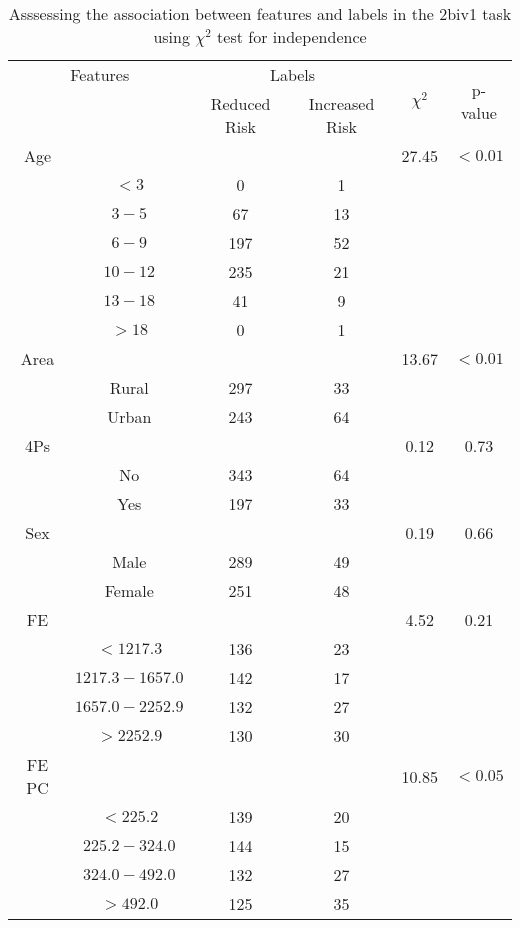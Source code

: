 \begin{table}[!htb]
\centering
\caption{Asssessing the association between features and labels in the 2biv1 task using $\chi^2$ test for independence}
\label{tab:chitest_2biv1}
\begin{tabular}{c c | c c| c | c}
\hline
\multicolumn{2}{c|}{Features}& \multicolumn{2}{c|}{Labels}& \multirow{2}{*}{$\chi^2$} & \multirow{2}{*}{p-value}\\ 
& & Reduced Risk & Increased Risk & & \\ 
\hline
Age &  &  & & 27.45 & $< 0.01$ \\ 
& $< 3$ & 0 & 1& & \\ 
& $3-5$ & 67 & 13& & \\ 
& $6-9$ & 197 & 52& & \\ 
& $10-12$ & 235 & 21& & \\ 
& $13-18$ & 41 & 9& & \\ 
& $> 18$ & 0 & 1& & \\ 
\hline 
Area &  &  & & 13.67 & $< 0.01$ \\ 
& Rural & 297 & 33& & \\ 
& Urban & 243 & 64& & \\ 
\hline 
4Ps &  &  & & 0.12 & 0.73 \\ 
& No & 343 & 64& & \\ 
& Yes & 197 & 33& & \\ 
\hline 
Sex &  &  & & 0.19 & 0.66 \\ 
& Male & 289 & 49& & \\ 
& Female & 251 & 48& & \\ 
\hline 
FE &  &  & & 4.52 & 0.21 \\ 
& $< 1217.3$ & 136 & 23& & \\ 
& $1217.3-1657.0$ & 142 & 17& & \\ 
& $1657.0-2252.9$ & 132 & 27& & \\ 
& $> 2252.9$ & 130 & 30& & \\ 
\hline 
FE PC &  &  & & 10.85 & $< 0.05$ \\ 
& $< 225.2$ & 139 & 20& & \\ 
& $225.2-324.0$ & 144 & 15& & \\ 
& $324.0-492.0$ & 132 & 27& & \\ 
& $> 492.0$ & 125 & 35& & \\ 
\hline 
\end{tabular}
\end{table}
